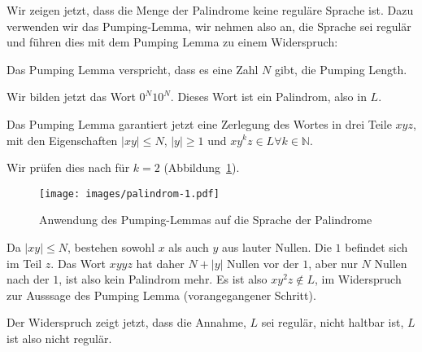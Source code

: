 Wir zeigen jetzt, dass die Menge der Palindrome keine reguläre Sprache ist.
Dazu verwenden wir das Pumping-Lemma, wir nehmen also an, die Sprache
sei regulär und führen dies mit dem Pumping Lemma zu einem Widerspruch:
\begin{compactenum}
\item Das Pumping Lemma verspricht, dass es eine Zahl $N$ gibt, die
Pumping Length.
\item Wir bilden jetzt das Wort $0^N10^N$.
Dieses Wort ist ein Palindrom,
also in $L$.
\item Das Pumping Lemma garantiert jetzt eine Zerlegung des Wortes
in drei Teile $xyz$, mit den Eigenschaften $|xy|\le N$, $|y|\ge 1$ und
$xy^kz\in L\forall k\in\mathbb N$.
\item Wir prüfen dies nach für $k=2$ (Abbildung~\ref{regular:pl-palindrome}).
\begin{figure}
\centering
\texttt{[image: images/palindrom-1.pdf]}
\caption{Anwendung des Pumping-Lemmas auf die Sprache der Palindrome
\label{regular:pl-palindrome}}
\end{figure}
Da $|xy|\le N$, bestehen sowohl $x$ als auch $y$ aus lauter Nullen.
Die $1$ befindet sich im Teil $z$.
Das Wort $xyyz$ hat daher $N+|y|$ Nullen vor der $1$, aber nur $N$ Nullen
nach der $1$, ist also kein Palindrom mehr.
Es ist also $xy^2z\not\in L$,
im Widerspruch zur Ausssage des Pumping Lemma (vorangegangener Schritt).
\end{compactenum}
Der Widerspruch zeigt jetzt, dass die Annahme, $L$ sei regulär, nicht
haltbar ist, $L$ ist also nicht regulär.

